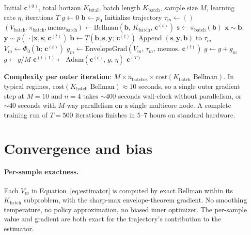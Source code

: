 \documentclass[11pt,a4paper]{article}
\newcommand{\bc}{\bm{c}}
\newcommand{\bx}{\bm{x}}
\newcommand{\by}{\bm{y}}
\newcommand{\bs}{\bm{s}}
\newcommand{\bb}{\bm{b}}
\begin{document}
\begin{algorithm}[H]
\caption{Stochastic Batched DP}
\label{alg:sbdp}
\begin{algorithmic}[1]
\Require Initial $\bc^{(0)}$, total horizon $K_\mathrm{total}$, batch length $K_\mathrm{batch}$, sample size $M$, learning rate $\eta$, iterations $T$
    \State $g \gets 0$
        \State $\bb \gets p_0$
        \State Initialize trajectory $\tau_m \gets ()$
            \State $(V_\mathrm{batch}, \pi_\mathrm{batch}, \mathrm{memo}_\mathrm{batch}) \gets \mathrm{Bellman}(\bb,\, K_\mathrm{batch},\, \bc^{(t)})$
                \State $\bs \gets \pi_\mathrm{batch}(\bb)$
                \State $\bx \sim \bb$;  $\by \sim p(\,\cdot \mid \bx, \bs;\, \bc^{(t)})$
                \State $\bb \gets T(\bb, \bs, \by;\, \bc^{(t)})$
                \State Append $(\bs, \by, \bb)$ to $\tau_m$
            \EndFor
        \EndFor
        \State $V_m \gets \Phi_0(\bb;\, \bc^{(t)})$ 
        \State $g_m \gets \mathrm{EnvelopeGrad}(V_m,\, \tau_m,\, \mathrm{memos},\, \bc^{(t)})$
        \State $g \gets g + g_m$
    \EndFor
    \State $g \gets g / M$
    \State $\bc^{(t+1)} \gets \mathrm{Adam}(\bc^{(t)},\, g,\, \eta)$
\EndFor
\State \Return $\bc^{(T)}$
\end{algorithmic}
\end{algorithm}

\textbf{Complexity per outer iteration}: $M \times n_\mathrm{batches} \times
\mathrm{cost}(K_\mathrm{batch} \text{ Bellman})$.  In typical regimes,
$\mathrm{cost}(K_\mathrm{batch} \text{ Bellman}) \approx 10$ seconds, so a single outer
gradient step at $M = 10$ and $n = 4$ takes $\sim 400$ seconds wall-clock without
parallelism, or $\sim 40$ seconds with $M$-way parallelism on a single multicore node.
A complete training run of $T = 500$ iterations finishes in 5--7 hours on standard
hardware.

\section{Convergence and bias}
\label{sec:convergence}

\paragraph{Per-sample exactness.}  Each $V_m$ in Equation~\eqref{eq:estimator} is computed
by exact Bellman within its $K_\mathrm{batch}$ subproblem, with the sharp-max
envelope-theorem gradient.  No smoothing temperature, no policy approximation, no biased
inner optimizer.  The per-sample value and gradient are both exact for the trajectory's
contribution to the estimator.
\end{document}
